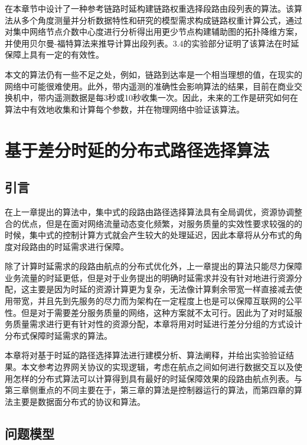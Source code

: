 在本章节中设计了一种参考链路时延构建链路权重选择段路由段列表的算法。该算法从多个角度测量并分析数据特性和研究的模型需求构成链路权重计算公式，通过对集中网络节点介数中心度进行分析得出用更少节点构建辅助图的拓扑降维方案，并使用贝尔曼-福特算法来推导计算出段列表。3.4的实验部分证明了该算法在时延保障上具有一定的有效性。

本文的算法仍有一些不足之处，例如，链路到达率是一个相当理想的值，在现实的网络中可能很难使用。此外，带内遥测的准确性会影响算法的结果，目前在商业交换机中，带内遥测数据是每3秒或10秒收集一次。因此，未来的工作是研究如何在算法中有效地收集和计算每个参数，并在物理网络中验证该算法。

\chapter{基于差分时延的分布式路径选择算法}

\section{引言}

在上一章提出的算法中，集中式的段路由路径选择算法具有全局调优，资源协调整合的优点，但是在面对网络流量动态变化频繁，对服务质量的实效性要求较强的的时候，集中式的控制计算方式就会产生较大的处理延迟，因此本章将从分布式的角度对段路由的时延需求进行保障。

除了计算时延需求的段路由航点的分布式优化外，上一章提出的算法只能尽力保障业务流量的时延更低，但是对于业务提出的明确时延需求并没有针对地进行资源分配，这主要是因为时延的资源计算更为复杂，无法像计算剩余带宽一样直接减去使用带宽，并且先到先服务的尽力而为架构在一定程度上也是可以保障互联网的公平性。但是对于需要差分服务质量的网络，这种方案就不太可行。因此为了对时延服务质量需求进行更有针对性的资源分配，本章将用对时延进行差分分组的方式设计分布式保障时延需求的算法。

本章将对基于时延的路径选择算法进行建模分析、算法阐释，并给出实验验证结果。本文参考边界网关协议的实现逻辑，考虑在航点之间如何进行数据交互以及使用怎样的分布式算法可以计算得到具有最好的时延保障效果的段路由航点列表。与第三章侧重点的不同主要在于，第三章的算法是控制器运行的算法，而第四章的算法主要是数据面分布式的协议和算法。

\section{问题模型}

